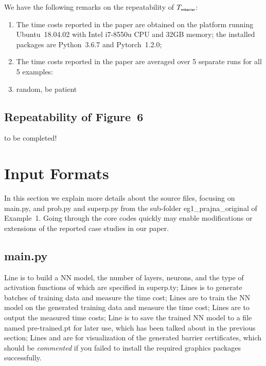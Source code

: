 \documentclass{llncs}
\begin{document}
We have the following remarks on the repeatability of $T_{\textsf{\tiny nnbarrier}}$:
\begin{enumerate}
    \item The time costs reported in the paper are obtained on the platform running Ubuntu~18.04.02 with Intel i7-8550u
            CPU and 32GB memory; the installed packages are \textsf{\small Python~3.6.7} and \textsf{\small Pytorch~1.2.0};
    \item The time costs reported in the paper are averaged over 5 separate runs for all 5 examples:
    \item random, be patient
\end{enumerate}

\subsection{Repeatability of Figure~6}
to be completed!

\section{Input Formats}

In this section we explain more details about the source files, focusing on \textsf{main.py}, and \textsf{prob.py} and \textsf{superp.py} from the sub-folder
{\color{blue}\textsf{eg1\_prajna\_original}} of Example~1. Going through the core codes quickly may enable modifications or extensions of
the reported case studies in our paper.

\subsection{\textsf{main.py}}
Line 
is to build a NN model, the number of layers, neurons, and the type of activation functions of which are specified in \textsf{superp.ty};
Lines
is to generate batches of training data and measure the time cost; 
Lines
are to train the NN model on the generated training data and measure the time cost;
Lines
are to output the measured time costs; 
Line
is to save the trained NN model to a file named \textsf{pre-trained.pt} for later use, which has been talked about in the previous section;
Lines
and
are for visualization of the generated barrier certificates, which should be \emph{commented} if you
failed to install the required graphics packages successfully.
\end{document}
